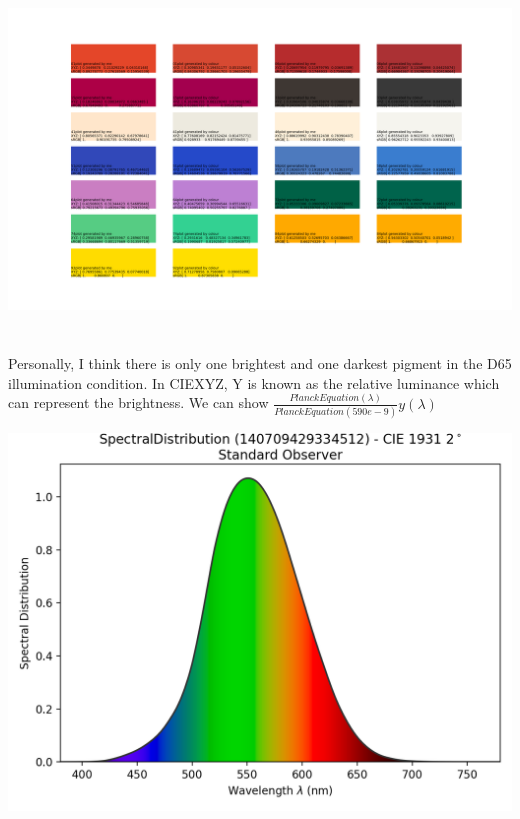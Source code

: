 \documentclass{article}
\begin{document}
\includegraphics[width=\textwidth]{h5_1.png}

\section{}
Personally, I think there is only one brightest and one darkest pigment in the D65 illumination condition. In CIEXYZ, Y is known as the relative luminance which can represent the brightness. We can show $\frac{PlanckEquation(\lambda)}{PlanckEquation(590e-9)} y(\lambda)$

\includegraphics{h5_2.png}
\end{document}
